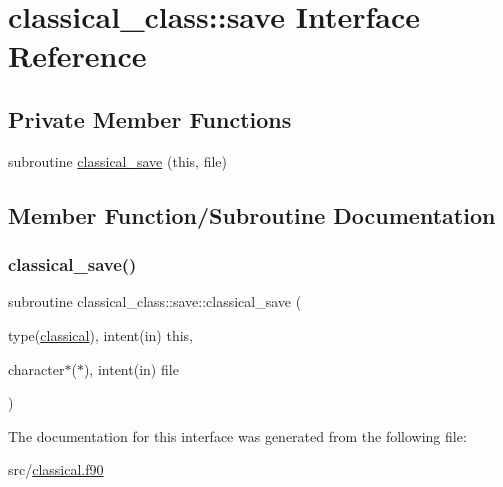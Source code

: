 \hypertarget{interfaceclassical__class_1_1save}{}\section{classical\+\_\+class\+:\+:save Interface Reference}
\label{interfaceclassical__class_1_1save}
\subsection*{Private Member Functions}
\begin{DoxyCompactItemize}
\item 
subroutine \hyperlink{interfaceclassical__class_1_1save_a3710bb3345b551ec9b865a568e994c4d}{classical\+\_\+save} (this, file)
\end{DoxyCompactItemize}


\subsection{Member Function/\+Subroutine Documentation}
\mbox{\label{interfaceclassical__class_1_1save_a3710bb3345b551ec9b865a568e994c4d}} 
\subsubsection{\texorpdfstring{classical\+\_\+save()}{classical\_save()}}
{\footnotesize\ttfamily subroutine classical\+\_\+class\+::save\+::classical\+\_\+save (\begin{DoxyParamCaption}\item[{type(\hyperlink{structclassical__class_1_1classical}{classical}), intent(in)}]{this,  }\item[{character$\ast$($\ast$), intent(in)}]{file }\end{DoxyParamCaption})\hspace{0.3cm}{\ttfamily [private]}}



The documentation for this interface was generated from the following file\+:\begin{DoxyCompactItemize}
\item 
src/\hyperlink{classical_8f90}{classical.\+f90}\end{DoxyCompactItemize}
